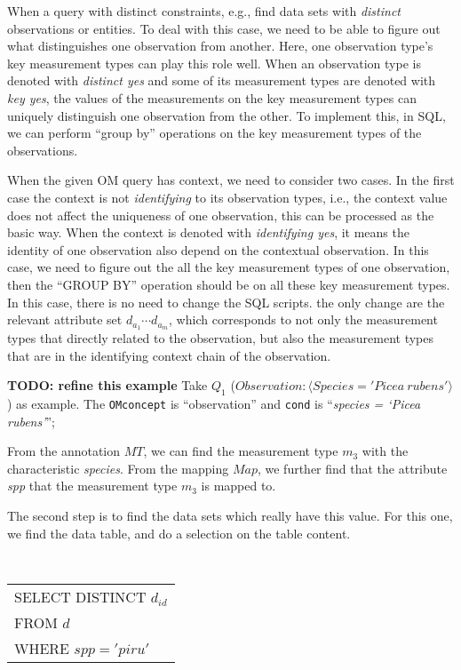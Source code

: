 When a query with distinct constraints, e.g., find data sets with {\em distinct} observations or
entities. To deal with this case,
we need to be able to figure out what distinguishes one observation
from another. Here, one observation type's key measurement types can
play this role well.
When an observation type is denoted with {\em distinct yes} and some
of its measurement types are denoted with {\em key yes},
the values of the measurements on the key measurement types can
uniquely distinguish one observation from the other.
To implement this, in SQL, we can perform ``group by'' operations on
the key measurement types of the observations.

When the given OM query has context, we need to consider two cases.
In the first case the context is not {\em identifying} to its
observation types, i.e., the context value
does not affect the uniqueness of one observation, this can be
processed as the basic way.
When the context is denoted with {\em identifying yes}, it means the
identity of one observation also depend on the contextual
observation.
In this case, we need to figure out the all the key measurement types
of one observation, then the ``GROUP BY'' operation should be on all
these key measurement types.
In this case, there is no need to change the SQL scripts.
the only change are the relevant attribute set $d_{a_1} \cdots
d_{a_m}$, which corresponds to not only the measurement types that
directly related to the observation, but also the measurement types
that are in the identifying context chain of the observation.



\begin{example}\label{eg:query_reqerite_q1}
{\bf TODO: refine this example}
Take $Q_1$ ($Observation: \langle Species='Picea~rubens'\rangle$) as
example.
The {\tt OMconcept} is ``observation'' and {\tt cond} is ``{\em species = `Picea rubens'}'';

From the annotation $MT$, we can find the measurement type
$m_3$ with the characteristic {\em species}.
From the mapping $Map$, we further find that the attribute {\em spp} that the
measurement type $m_3$ is mapped to.

The second step is to find the data sets which really have this value.
For this one, we find the data table, and do a selection on the table
content.

\vspace{0.1in}
{\tt
\begin{tabular}{l}
SELECT DISTINCT $d_{id}$\\
FROM $d$\\
WHERE $spp = 'piru'$
\end{tabular}
}
\vspace{0.1in}

\end{example}

